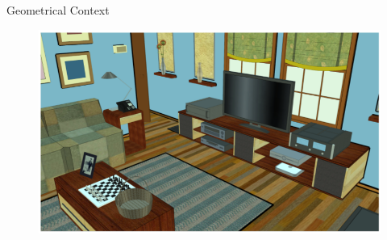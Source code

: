 \documentclass{beamer}
\begin{document}
\begin{frame}{Geometrical Context}
\begin{figure}[t!]
\includegraphics[width=.8\linewidth]{contextHoleFilled.png}
\end{figure}
\end{frame}
\end{document}
